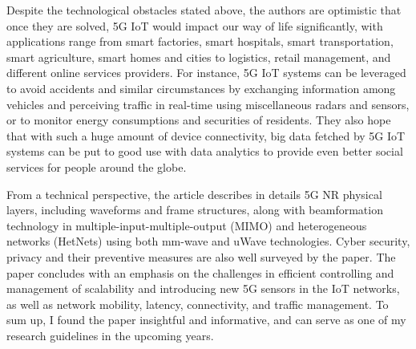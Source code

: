 \documentclass[12pt, a4paper, onside]{article}
\begin{document}
Despite the technological obstacles stated above, the authors are optimistic that once they are solved, 5G IoT would impact our way of life significantly, with applications range from smart factories, smart hospitals, smart transportation, smart agriculture, smart homes and cities to logistics, retail management, and different online services providers. For instance, 5G IoT systems can be leveraged to avoid accidents and similar circumstances by exchanging information among vehicles and perceiving traffic in real-time using miscellaneous radars and sensors, or to monitor energy consumptions and securities of residents. They also hope that with such a huge amount of device connectivity, big data fetched by 5G IoT systems can be put to good use with data analytics to provide even better social services for people around the globe.

From a technical perspective, the article describes in details 5G NR physical layers, including waveforms and frame structures, along with beamformation technology in multiple-input-multiple-output (MIMO) and heterogeneous networks (HetNets) using both mm-wave and uWave technologies. Cyber security, privacy and their preventive measures are also well surveyed by the paper. The paper concludes with an emphasis on the challenges in efficient controlling and management of scalability and introducing new 5G sensors in the IoT networks, as well as network mobility, latency, connectivity, and traffic management. To sum up, I found the paper insightful and informative, and can serve as one of my research guidelines in the upcoming years.

\printbibliography
\end{document}
